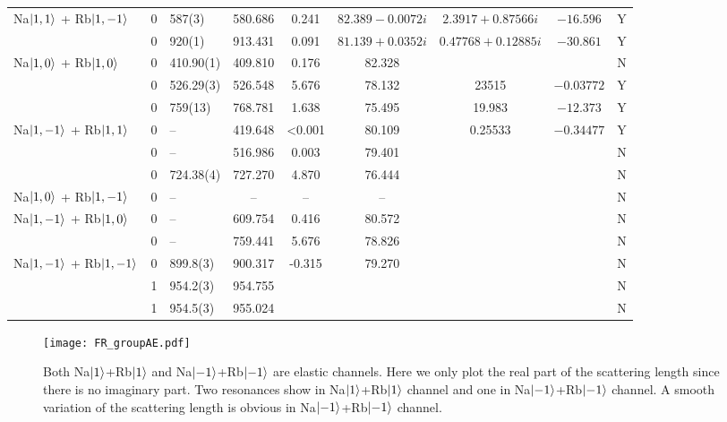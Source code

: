 \begin{sidewaystable}[thp]
\begin{tabular}{l|c|l|c|c|c|c|c|c}
Na$\ket{1,1}$ + Rb$\ket{1,-1}$ 	& 0    	& 587(3)         & 580.686 			& 0.241  & $82.389 - 0.0072 i $  & $2.3917 + 0.87566 i$&$-16.596$& Y     \\
							  	& 0    	& 920(1)         & 913.431 			& 0.091  & $81.139 + 0.0352 i$ & $0.47768 + 0.12885 i$& $-30.861$& Y     \\ \hline
Na$\ket{1,0}$ + Rb$\ket{1,0}$  	& 0    	& 410.90(1)         & 409.810 			& 0.176  & 82.328                 & & & N     \\
    							& 0    	& 526.29(3)         & 526.548 			& 5.676  & 78.132                 &23515 &$-0.03772$ & Y     \\
    							& 0    	& 759(13)           & 768.781 			& 1.638  & 75.495                 &19.983 &$-12.373$ & Y     \\ \hline
Na$\ket{1,-1}$ + Rb$\ket{1,1}$ 	& 0    	& --		        & 419.648 			& <0.001  & 80.109                &0.25533 &$-0.34477$ & Y     \\
								& 0    	& --        		& 516.986 			& 0.003  & 79.401                 & & & N     \\	
								& 0    	& 724.38(4)         & 727.270 			& 4.870  & 76.444                 & & & N     \\ \hline
Na$\ket{1,0}$ + Rb$\ket{1,-1}$  & 0    	& --          		& -- 			& -- & --                             & & & N     \\ \hline
Na$\ket{1,-1}$ + Rb$\ket{1,0}$  & 0    	& --          		& 609.754 			& 0.416 & 80.572                  & & & N     \\
								& 0		& --				& 759.441			& 5.676 & 78.826				  & & & N \\ \hline	
Na$\ket{1,-1}$ + Rb$\ket{1,-1}$ & 0    	& 899.8(3)          & 900.317 			& -0.315 & 79.270                 & & & N     \\
								& 1    	& 954.2(3)          & 954.755 			&   &         				      & & & N     \\
								& 1    	& 954.5(3)          & 955.024 			&   &         					  & & & N     \\
\hline \hline
\end{tabular}
\end{sidewaystable}

\begin{figure}[tb]
\begin{center}
\texttt{[image: FR\_groupAE.pdf]}
\end{center}
\caption[Scattering lengths of Na$\ket{1}$+Rb$\ket{1}$ and Na$\ket{-1}$+Rb$\ket{-1}$ elastic channels]{Both Na$\ket{1}$+Rb$\ket{1}$ and Na$\ket{-1}$+Rb$\ket{-1}$ are elastic channels. Here we only plot the real part of the scattering length since there is no imaginary part. Two resonances show in Na$\ket{1}$+Rb$\ket{1}$ channel and one in Na$\ket{-1}$+Rb$\ket{-1}$ channel. A smooth variation of the scattering length is obvious in Na$\ket{-1}$+Rb$\ket{-1}$ channel.}
\label{FR_groupAE}
\end{figure}

